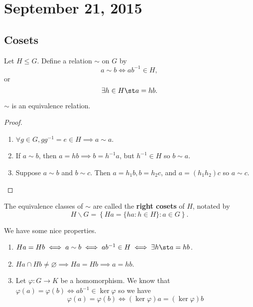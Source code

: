 \section{September 21, 2015}

\subsection{Cosets}

\begin{df}
Let $H \leq G$. Define a relation $\sim$ on $G$ by
\[ a \sim b \iff ab^{-1} \in H, \]
or
\[ \exists h \in H \st a = hb. \]
\end{df}

\begin{prop}
$\sim$ is an equivalence relation.
\end{prop}

\begin{proof}
$ $
\begin{enumerate}
\item $\forall g \in G, gg^{-1} = e \in H \implies a \sim a$.
\item If $a \sim b$, then $a = hb \implies b = h^{-1}a$, but $h^{-1} \in
H$ so $b \sim a$.
\item Suppose $a \sim b$ and $b \sim c$. Then $a = h_1 b, b = h_2 c$,
and $a = (h_1 h_2)c$ so $a \sim c$.
\end{enumerate}
\end{proof}

\begin{df}
The equivalence classes of $\sim$ are called the \textbf{right cosets}
of $H$, notated by
\[ H \backslash G = \left\lbrace Ha = \lbrace ha : h \in H \rbrace : a
\in G \right\rbrace. \]
\end{df}

\begin{rem}
We have some nice properties.
\begin{enumerate}
\item $Ha = Hb \iff a \sim b \iff ab^{-1} \in H \iff \exists h \st a =
hb$.
\item $Ha \cap Hb \neq \varnothing \implies Ha = Hb \implies a = hb$.
\item Let $\varphi : G \to K$ be a homomorphism. We know that
$\varphi(a) = \varphi(b) \iff ab^{-1} \in \ker\varphi$ so we have
\[ \varphi(a) = \varphi(b) \iff (\ker\varphi)a = (\ker\varphi)b \]
\end{enumerate}
\end{rem}

